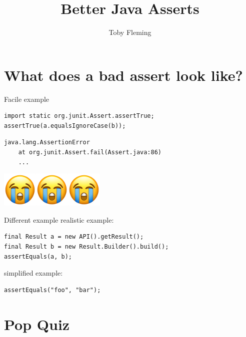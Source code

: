 \documentclass[xetex,12pt,aspectratio=169]{beamer}
\title{Better Java Asserts}
\subtitle{}
\author{Toby Fleming}
\begin{document}
\maketitle

\section{What does a bad assert look like?}

\begin{frame}[fragile]{Facile example}
\begin{verbatim}
import static org.junit.Assert.assertTrue;
assertTrue(a.equalsIgnoreCase(b));
\end{verbatim}
\vfill
\begin{verbatim}
java.lang.AssertionError
    at org.junit.Assert.fail(Assert.java:86)
    ...
\end{verbatim}
\vfill
\begin{center}
\includegraphics[height=48pt]{glyph-u1F62D.png}\includegraphics[height=48pt]{glyph-u1F62D.png}\includegraphics[height=48pt]{glyph-u1F62D.png}
\end{center}
\end{frame}

\begin{frame}[fragile,t]{Different example}
realistic example:
\vfill
\begin{verbatim}
final Result a = new API().getResult();
final Result b = new Result.Builder().build();
assertEquals(a, b);
\end{verbatim}
\vfill
simplified example:
\vfill
\begin{verbatim}
assertEquals("foo", "bar");
\end{verbatim}
\end{frame}

\section{Pop Quiz}
\end{document}
